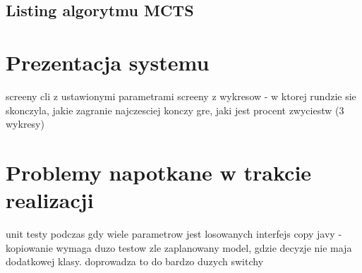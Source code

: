 \subsection{Listing algorytmu MCTS}

\section{Prezentacja systemu}
screeny cli z ustawionymi parametrami
screeny z wykresow - w ktorej rundzie sie skonczyla, jakie zagranie najczesciej konczy gre, jaki jest procent zwyciestw (3 wykresy)

\section{Problemy napotkane w trakcie realizacji}
unit testy podczas gdy wiele parametrow jest losowanych
interfejs copy javy - kopiowanie wymaga duzo testow
zle zaplanowany model, gdzie decyzje nie maja dodatkowej klasy. doprowadza to do bardzo duzych switchy